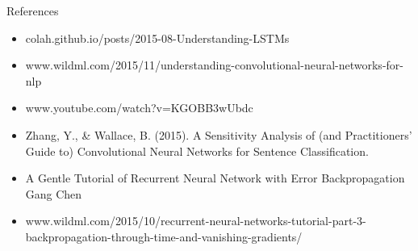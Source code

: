 \documentclass{beamer}
\begin{document}
\begin{frame}{References}
\begin{itemize}
    \item colah.github.io/posts/2015-08-Understanding-LSTMs
    \item www.wildml.com/2015/11/understanding-convolutional-neural-networks-for-nlp
    \item www.youtube.com/watch?v=KGOBB3wUbdc
    \item Zhang, Y., & Wallace, B. (2015). A Sensitivity Analysis of (and Practitioners’ Guide to) Convolutional Neural Networks for Sentence Classification.
    \item A Gentle Tutorial of Recurrent Neural Network with Error Backpropagation Gang Chen 
    \item www.wildml.com/2015/10/recurrent-neural-networks-tutorial-part-3-backpropagation-through-time-and-vanishing-gradients/
\end{itemize}
\end{frame}
\end{document}
